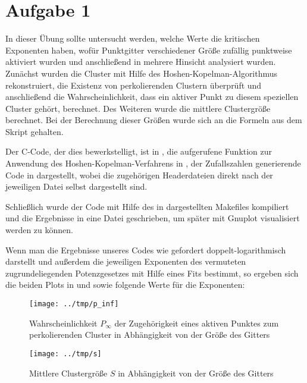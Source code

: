 \section*{Aufgabe 1}
In dieser Übung sollte untersucht werden, welche Werte die kritischen Exponenten
haben, wofür Punktgitter verschiedener Größe zufällig punktweise aktiviert wurden
und anschließend in mehrere Hinsicht analysiert wurden. Zunächst wurden die Cluster
mit Hilfe des Hoshen-Kopelman-Algorithmus rekonstruiert, die Existenz
von perkolierenden Clustern überprüft und anschließend die Wahrscheinlichkeit, dass
ein aktiver Punkt zu diesem speziellen Cluster gehört, berechnet. Des Weiteren
wurde die mittlere Clustergröße berechnet. Bei der Berechnung dieser Größen wurde
sich an die Formeln aus dem Skript gehalten.

Der C-Code, der dies bewerkstelligt, ist in , die aufgerufene
Funktion zur Anwendung des Hoshen-Kopelman-Verfahrens in , der Zufallszahlen
generierende Code in  dargestellt, wobei die zugehörigen Headerdateien 
direkt nach der jeweiligen Datei selbst dargestellt sind.




% 


Schließlich wurde der Code mit Hilfe des in  dargestellten Makefiles
kompiliert und die Ergebnisse in eine Datei geschrieben, um später mit Gnuplot
visualisiert werden zu können.



Wenn man die Ergebnisse unseres Codes wie gefordert doppelt-logarithmisch darstellt
und außerdem die jeweiligen Exponenten des vermuteten zugrundeliegenden Potenzgesetzes
mit Hilfe eines Fits bestimmt, so ergeben sich die beiden Plots in  und
 sowie folgende Werte für die Exponenten:

\begin{figure}[htb]
  \centering
  \texttt{[image: ../tmp/p\_inf]}
  \caption{Wahrscheinlichkeit $P_{\infty}$ der Zugehörigkeit eines aktiven Punktes zum perkolierenden Cluster in Abhängigkeit von der Größe des Gitters}
  \label{fig:P}
\end{figure}

\begin{figure}[htb]
  \centering
  \texttt{[image: ../tmp/s]}
  \caption{Mittlere Clustergröße $S$ in Abhängigkeit von der Größe des Gitters}
  \label{fig:S}
\end{figure}